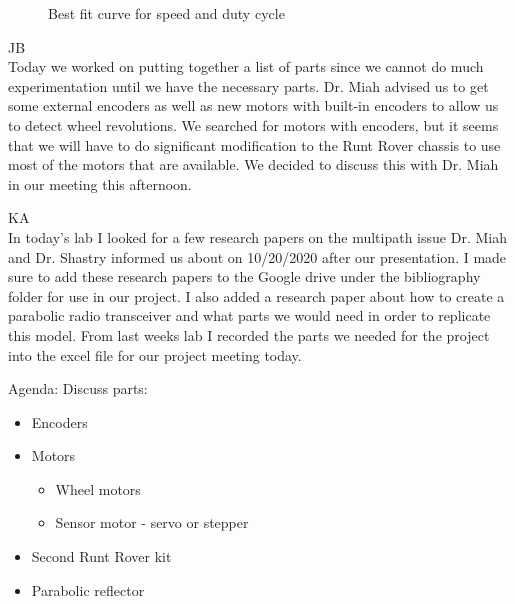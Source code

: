 \documentclass[fontsize=11pt, %
                             paper=letter, %
                             openany, %
                             captions=tableheading,
                             index=totoc,
                             hyperref]{labbook}
\begin{document}
\begin{addmargin}[0cm]{0cm}
\begin{figure}[h!]
    \caption{Best fit curve for speed and duty cycle}
    \label{fig:v(d)bestfit}
\end{figure}



JB\\
Today we worked on putting together a list of parts since we cannot do much experimentation until we have the necessary parts. Dr. Miah advised us to get some external encoders as well as new motors with built-in encoders to allow us to detect wheel revolutions. We searched for motors with encoders, but it seems that we will have to do significant modification to the Runt Rover chassis to use most of the motors that are available. We decided to discuss this with Dr. Miah in our meeting this afternoon.

\vspace*{12pt}
KA\\
In today's lab I looked for a few research papers on the multipath issue Dr. Miah and Dr. Shastry informed us about on 10/20/2020 after our presentation. I made sure to add these research papers to the Google drive under the bibliography folder for use in our project. I also added a research paper about how to create a parabolic radio transceiver and what parts we would need in order to replicate this model. From last weeks lab I recorded the parts we needed for the project into the excel file for our project meeting today.

Agenda: Discuss parts:
\begin{itemize}
    \item Encoders
    \item Motors
    \begin{itemize}
        \item Wheel motors
        \item Sensor motor - servo or stepper
    \end{itemize}
    \item Second Runt Rover kit
    \item Parabolic reflector
\end{itemize}


\end{addmargin}
\end{document}
